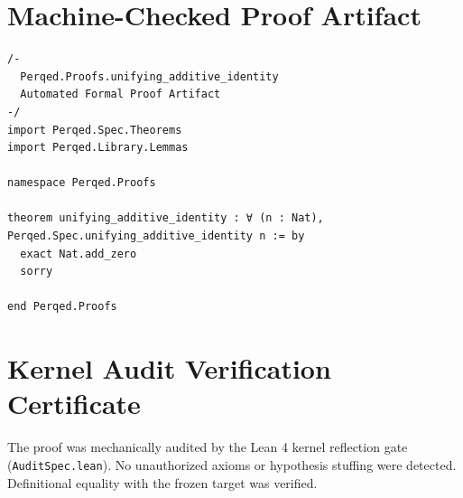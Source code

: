 \documentclass[11pt,a4paper]{article}
\begin{document}
\section{Machine-Checked Proof Artifact}
\begin{lstlisting}[language=Lean]
/-
  Perqed.Proofs.unifying_additive_identity
  Automated Formal Proof Artifact
-/
import Perqed.Spec.Theorems
import Perqed.Library.Lemmas

namespace Perqed.Proofs

theorem unifying_additive_identity : ∀ (n : Nat), Perqed.Spec.unifying_additive_identity n := by
  exact Nat.add_zero
  sorry

end Perqed.Proofs
\end{lstlisting}

\section{Kernel Audit Verification Certificate}
The proof was mechanically audited by the Lean 4 kernel reflection gate (\texttt{AuditSpec.lean}). No unauthorized axioms or hypothesis stuffing were detected. Definitional equality with the frozen target was verified.
\end{document}

